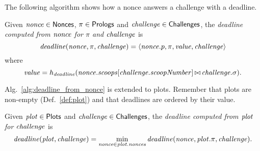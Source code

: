 %
The following algorithm shows how a nonce answers a challenge with a deadline.
%
\begin{alg}[$\deadline(\nonce,\pi,\challenge)$]\label{alg:deadline_from_nonce}
  Given ${\mathit{nonce}}\in{\mathsf{Nonces}}$, $\pi\in{\mathsf{Prologs}}$ and ${\mathit{challenge}}\in{\mathsf{Challenges}}$, the
  \emph{deadline computed from ${\mathit{nonce}}$ for $\pi$ and ${\mathit{challenge}}$} is
  \[
  {\mathit{deadline}}({\mathit{nonce}},\pi,{\mathit{challenge}})=\langle{\mathit{nonce}}.p,\pi,\mathit{value},{\mathit{challenge}}\rangle
  \]
  where
  \[
  \mathit{value}=h_{\mathit{deadline}}({\mathit{nonce}}.{\mathit{scoops}}[{\mathit{challenge}}.{\mathit{scoopNumber}}]\operatorname*{\bowtie}{\mathit{challenge}}.\sigma).
  \]
\end{alg}
%
Alg.~\ref{alg:deadline_from_nonce} is extended to plots. Remember that plots are non-empty
(Def.~\ref{def:plot}) and that deadlines are ordered by their value.
%
\begin{alg}[$\deadline(\plot,\challenge)$]\label{alg:deadline_from_plot}
  Given ${\mathit{plot}}\in{\mathsf{Plots}}$ and ${\mathit{challenge}}\in{\mathsf{Challenges}}$, the \emph{deadline computed
  from ${\mathit{plot}}$ for ${\mathit{challenge}}$} is
  \[
  {\mathit{deadline}}({\mathit{plot}},{\mathit{challenge}})=\min\limits_{{\mathit{nonce}}\in{\mathit{plot}}.{\mathit{nonces}}}{\mathit{deadline}}({\mathit{nonce}},{\mathit{plot}}.\pi,{\mathit{challenge}}).
  \]
\end{alg}
